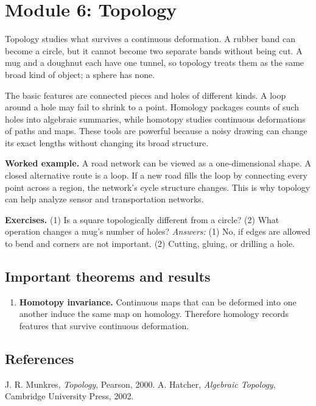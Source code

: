 \documentclass[11pt,oneside]{book}
\makeatletter
\renewenvironment{thebibliography}[1]
  {\list{\@biblabel{\@arabic\c@enumiv}}%
    {\settowidth\labelwidth{\@biblabel{#1}}%
     \leftmargin\labelwidth
     \advance\leftmargin\labelsep
     \usecounter{enumiv}%
     \let\p@enumiv\@empty
     \renewcommand\theenumiv{\@arabic\c@enumiv}}}
  {\endlist}
\makeatother
\begin{document}
\chapter[Module 6: Topology]{Module 6: Topology}
Topology studies what survives a continuous deformation. A rubber band can become a circle, but it cannot become two separate bands without being cut. A mug and a doughnut each have one tunnel, so topology treats them as the same broad kind of object; a sphere has none.

The basic features are connected pieces and holes of different kinds. A loop around a hole may fail to shrink to a point. Homology packages counts of such holes into algebraic summaries, while homotopy studies continuous deformations of paths and maps. These tools are powerful because a noisy drawing can change its exact lengths without changing its broad structure.

\textbf{Worked example.} A road network can be viewed as a one-dimensional shape. A closed alternative route is a loop. If a new road fills the loop by connecting every point across a region, the network's cycle structure changes. This is why topology can help analyze sensor and transportation networks.

\textbf{Exercises.} (1) Is a square topologically different from a circle? (2) What operation changes a mug's number of holes? \emph{Answers:} (1) No, if edges are allowed to bend and corners are not important. (2) Cutting, gluing, or drilling a hole.

\section*{Important theorems and results}
\begin{enumerate}[leftmargin=*,itemsep=0.35em]
\item \textbf{Homotopy invariance.} Continuous maps that can be deformed into one another induce the same map on homology. Therefore homology records features that survive continuous deformation.
\end{enumerate}

\section*{References}
\begin{thebibliography}{9}
 J. R. Munkres, \emph{Topology}, Pearson, 2000.
 A. Hatcher, \emph{Algebraic Topology}, Cambridge University Press, 2002.
\end{thebibliography}
\end{document}
